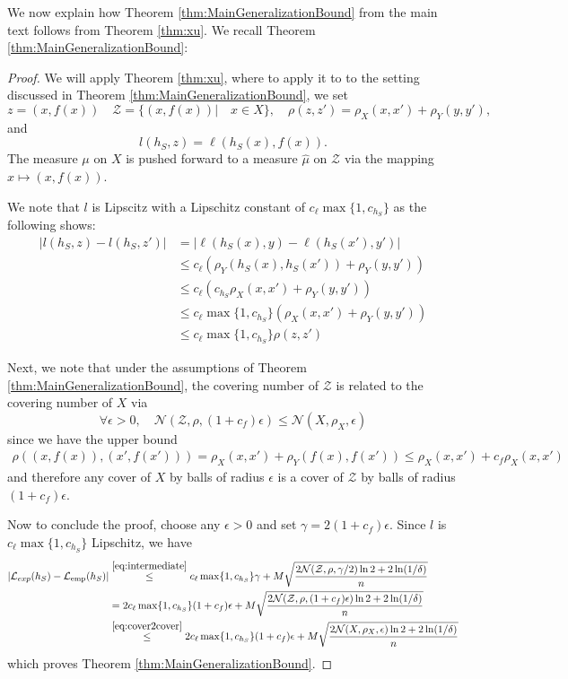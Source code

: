\documentclass{article}
\theoremstyle{definition}
\theoremstyle{plain}
\newcommand{\N}{\mathcal{N}}
\newcommand{\Lemp}{\mathcal{L}_{\mathrm{emp}}}
\begin{document}
We now explain how Theorem \ref{thm:MainGeneralizationBound} from the main text follows from Theorem \ref{thm:xu}. We recall Theorem \ref{thm:MainGeneralizationBound}:
\MainGeneralizationBound*
\begin{proof}
We will apply Theorem \ref{thm:xu}, where to apply it to
 to the setting discussed in Theorem \ref{thm:MainGeneralizationBound}, we set
$$z=(x,f(x))  \quad \mathcal{Z}=\{(x,f(x))| \quad x\in X  \} , \quad \rho(z,z')=\rho_X(x,x')+\rho_Y(y,y'), $$
and 
$$l(h_S,z)=\ell(h_S(x),f(x)) . $$
The measure $\mu$ on $X$ is pushed forward to a measure $\hat \mu$ on $\mathcal{Z}$ via the mapping $x\mapsto (x,f(x)) $.

We note that $l$ is Lipscitz with a Lipschitz constant of $c_\ell \max\{1,c_{h_S} \}$ as the following shows: 
\begin{align*}
|l(h_S,z)-l(h_S,z')|&=|\ell(h_S(x),y)-\ell(h_S(x'),y')|\\
&\leq c_\ell \left( \rho_Y(h_S(x),h_S(x'))+\rho_Y(y,y')  \right)\\
&\leq c_\ell \left( c_{h_S}\rho_X(x,x')+\rho_Y(y,y')  \right)\\
&\leq c_\ell \max\{1,c_{h_S} \}\left( \rho_X(x,x')+\rho_Y(y,y') \right)\\
&\leq c_\ell \max\{1,c_{h_S} \} \rho(z,z')
\end{align*}

Next, we note that under the assumptions of Theorem \ref{thm:MainGeneralizationBound},  the covering number of $\mathcal{Z}$ is related to the covering number of $X $ via 
\begin{equation}\label{eq:cover2cover}
\forall \epsilon >0, \quad \N\left( \mathcal{Z},\rho, (1+c_f) \epsilon\right)\leq \N(X,\rho_X,\epsilon) \end{equation}
since we have the upper bound 
\begin{align*}
\rho\left( \left(x,f(x) \right), \left(x',f(x') \right) \right)=\rho_X(x,x')+\rho_Y(f(x),f(x'))
\leq \rho_X(x,x')+c_f\rho_X(x,x')
\end{align*}
and therefore any  cover of $X$ by balls of radius $\epsilon$ is a cover of $\mathcal{Z}$ by balls of radius $(1+c_f)\epsilon $. 

Now to conclude the proof, choose any $\epsilon>0$ and set $\gamma=2(1+c_f)\epsilon $. Since $l$ is $c_\ell \max\{1,c_{h_S} \} $ Lipschitz, we have 
\begin{align*}
|\mathcal{L}_{exp}(h_S) - \Lemp(h_S)|
&\stackrel{\eqref{eq:intermediate}}{\le} c_\ell \max\{1,c_{h_S} \} \gamma + M \sqrt{\frac{2\mathcal{N}( \mathcal{Z}, \rho, \gamma/2) \ln 2 + 2 \ln(1/\delta)}{n}}\\
&=2c_\ell \max\{1,c_{h_S} \} (1+c_f)\epsilon+M \sqrt{\frac{2\mathcal{N}(\mathcal{Z}, \rho, (1+c_f)\epsilon) \ln 2 + 2 \ln(1/\delta)}{n}}\\
&\stackrel{\eqref{eq:cover2cover}}{\le}
2c_\ell \max\{1,c_{h_S} \} (1+c_f)\epsilon+M \sqrt{\frac{2\mathcal{N}( X, \rho_X,\epsilon) \ln 2 + 2 \ln(1/\delta)}{n}}
\end{align*}
which proves Theorem \ref{thm:MainGeneralizationBound}.
\end{proof}
\end{document}

